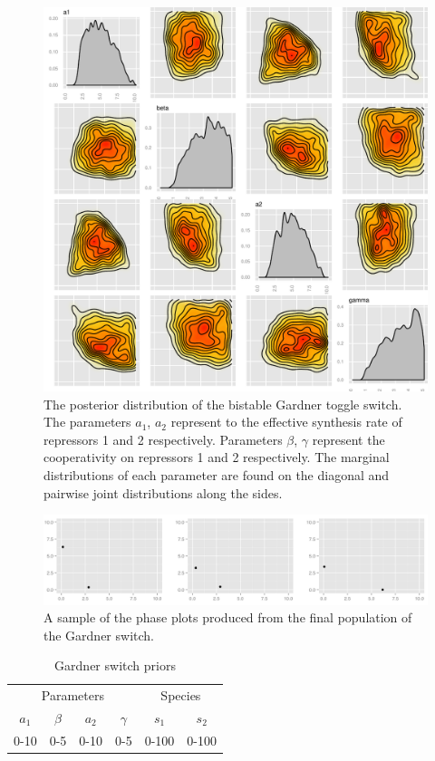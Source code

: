 \begin{figure}[p]
\centering
\includegraphics[scale=0.7]{images/Gardner/posterior.pdf}
\caption{The posterior distribution of the bistable Gardner toggle switch. The parameters $a_1$, $a_2$ represent to the effective synthesis rate of repressors 1 and 2 respectively. Parameters $\beta$, $\gamma$ represent the cooperativity on repressors 1 and 2 respectively. The marginal distributions of each parameter are found on the diagonal and pairwise joint distributions along the sides.}
\label{fig:Gard_post}
\end{figure}

\clearpage
\begin{figure}[p]
\centering
\includegraphics[scale=0.4]{images/Gardner/phase_plots.png}
\caption{A sample of the phase plots produced from the final population of the Gardner switch.}
\label{fig:det_gard_phase}
\end{figure}

\begin{table}[p]
\centering
\caption{Gardner switch priors}
\label{tab:gard}
\begin{tabular}{cccc|cc}
\multicolumn{4}{c|}{Parameters} & \multicolumn{2}{c}{Species} \\ %
$a_1$   & $\beta$   & $a_2$   & $\gamma$  &   $s_1$      &       $s_2$   \\
0-10    & 0-5       & 0-10    &  0-5      &      0-100   &          0-100   
\end{tabular}
\end{table}

